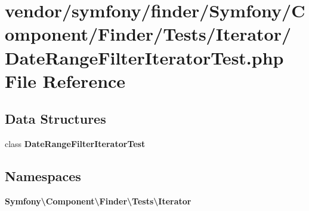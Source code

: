 \section{vendor/symfony/finder/\+Symfony/\+Component/\+Finder/\+Tests/\+Iterator/\+Date\+Range\+Filter\+Iterator\+Test.php File Reference}
\label{_date_range_filter_iterator_test_8php}
\subsection*{Data Structures}
\begin{DoxyCompactItemize}
\item 
class {\bf Date\+Range\+Filter\+Iterator\+Test}
\end{DoxyCompactItemize}
\subsection*{Namespaces}
\begin{DoxyCompactItemize}
\item 
 {\bf Symfony\textbackslash{}\+Component\textbackslash{}\+Finder\textbackslash{}\+Tests\textbackslash{}\+Iterator}
\end{DoxyCompactItemize}
